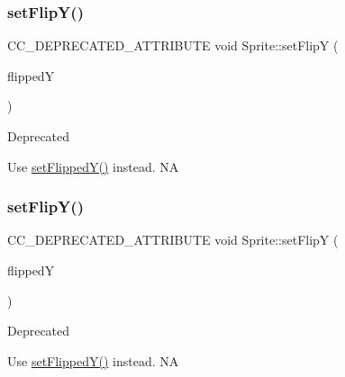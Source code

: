 \subsubsection{\texorpdfstring{set\+Flip\+Y()}{setFlipY()}\hspace{0.1cm}{\footnotesize\ttfamily [1/2]}}
{\footnotesize\ttfamily C\+C\+\_\+\+D\+E\+P\+R\+E\+C\+A\+T\+E\+D\+\_\+\+A\+T\+T\+R\+I\+B\+U\+TE void Sprite\+::set\+FlipY (\begin{DoxyParamCaption}\item[{bool}]{flippedY }\end{DoxyParamCaption})\hspace{0.3cm}{\ttfamily [inline]}}

\begin{DoxyRefDesc}{Deprecated}
\item[\hyperlink{deprecated__deprecated000043}{Deprecated}]Use \hyperlink{classSprite_ae0225a6dac4a1130bafff4619652b389}{set\+Flipped\+Y()} instead.  NA \end{DoxyRefDesc}
\mbox{\label{classSprite_a69358c4c56221ae9435a4c83074f0151}} 
\subsubsection{\texorpdfstring{set\+Flip\+Y()}{setFlipY()}\hspace{0.1cm}{\footnotesize\ttfamily [2/2]}}
{\footnotesize\ttfamily C\+C\+\_\+\+D\+E\+P\+R\+E\+C\+A\+T\+E\+D\+\_\+\+A\+T\+T\+R\+I\+B\+U\+TE void Sprite\+::set\+FlipY (\begin{DoxyParamCaption}\item[{bool}]{flippedY }\end{DoxyParamCaption})\hspace{0.3cm}{\ttfamily [inline]}}

\begin{DoxyRefDesc}{Deprecated}
\item[\hyperlink{deprecated__deprecated000273}{Deprecated}]Use \hyperlink{classSprite_ae0225a6dac4a1130bafff4619652b389}{set\+Flipped\+Y()} instead.  NA \end{DoxyRefDesc}
\mbox{\label{classSprite_a6cbc37c64ba7d2f0d37070c1c1a750ec}} 
